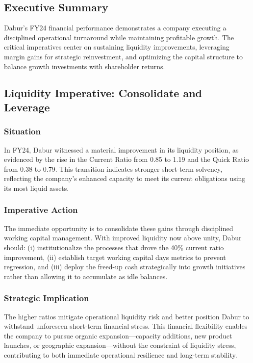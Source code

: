 \documentclass[12pt, a4paper]{report}
\begin{document}
\subsection{Executive Summary}

Dabur's FY24 financial performance demonstrates a company executing a disciplined operational turnaround while maintaining profitable growth. The critical imperatives center on sustaining liquidity improvements, leveraging margin gains for strategic reinvestment, and optimizing the capital structure to balance growth investments with shareholder returns.

\subsection{Liquidity Imperative: Consolidate and Leverage}

\subsubsection{Situation}
In FY24, Dabur witnessed a material improvement in its liquidity position, as evidenced by the rise in the Current Ratio from 0.85 to 1.19 and the Quick Ratio from 0.38 to 0.79. This transition indicates stronger short-term solvency, reflecting the company's enhanced capacity to meet its current obligations using its most liquid assets.

\subsubsection{Imperative Action}
The immediate opportunity is to consolidate these gains through disciplined working capital management. With improved liquidity now above unity, Dabur should: (i) institutionalize the processes that drove the 40\% current ratio improvement, (ii) establish target working capital days metrics to prevent regression, and (iii) deploy the freed-up cash strategically into growth initiatives rather than allowing it to accumulate as idle balances.

\subsubsection{Strategic Implication}
The higher ratios mitigate operational liquidity risk and better position Dabur to withstand unforeseen short-term financial stress. This financial flexibility enables the company to pursue organic expansion—capacity additions, new product launches, or geographic expansion—without the constraint of liquidity stress, contributing to both immediate operational resilience and long-term stability.
\end{document}
